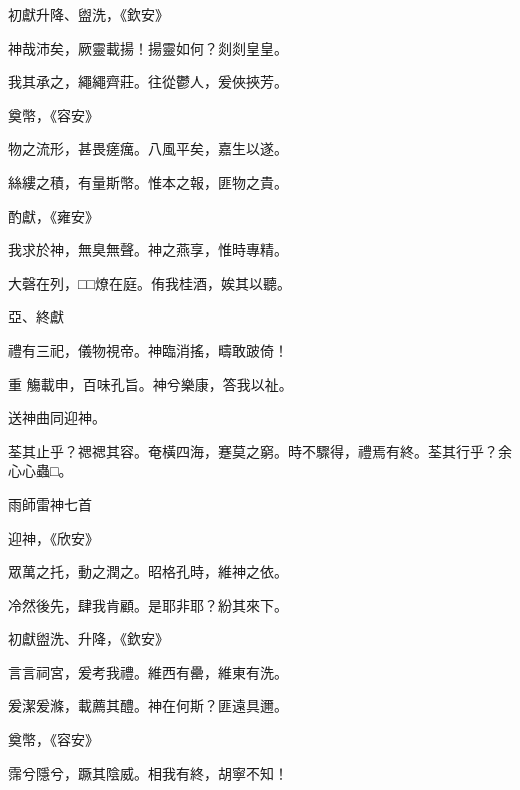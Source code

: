 \begin{pinyinscope}
 初獻升降、盥洗，《欽安》



 神哉沛矣，厥靈載揚！揚靈如何？剡剡皇皇。



 我其承之，繩繩齊莊。往從鬱人，爰俠挾芳。



 奠幣，《容安》



 物之流形，甚畏瘥癘。八風平矣，嘉生以遂。



 絲縷之積，有量斯幣。惟本之報，匪物之貴。



 酌獻，《雍安》



 我求於神，無臭無聲。神之燕享，惟時專精。



 大磬在列，□□燎在庭。侑我桂酒，娭其以聽。



 亞、終獻



 禮有三祀，儀物視帝。神臨消搖，疇敢跛倚！



 重
 觴載申，百味孔旨。神兮樂康，答我以祉。



 送神曲同迎神。



 荃其止乎？禗禗其容。奄橫四海，蹇莫之窮。時不驟得，禮焉有終。荃其行乎？余心心蟲□。



 雨師雷神七首



 迎神，《欣安》



 眾萬之托，動之潤之。昭格孔時，維神之依。



 冷然後先，肆我肯顧。是耶非耶？紛其來下。



 初獻盥洗、升降，《欽安》



 言言祠宮，爰考我禮。維西有罍，維東有洗。



 爰潔爰滌，載薦其醴。神在何斯？匪遠具邇。



 奠幣，《容安》



 霈兮隱兮，蹶其陰威。相我有終，胡寧不知！




\end{pinyinscope}
